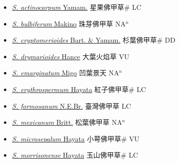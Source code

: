 \begin{itemize}
  \begin{itemize}
        \item[] \href{http://www.theplantlist.org/tpl1.1/search?q=Sedum+actinocarpum}{\textit{S. actinocarpum} Yamam.}   星果佛甲草\# LC
        \item[] \href{http://www.theplantlist.org/tpl1.1/search?q=Sedum+bulbiferum}{\textit{S. bulbiferum} Makino}   珠芽佛甲草 NA$^n$
        \item[] \href{http://www.theplantlist.org/tpl1.1/search?q=Sedum+cryptomerioides}{\textit{S. cryptomerioides} Bart. \& Yamam.}   杉葉佛甲草\# DD
        \item[] \href{http://www.theplantlist.org/tpl1.1/search?q=Sedum+drymarioides}{\textit{S. drymarioides} Hance}   大葉火焰草 VU
        \item[] \href{http://www.theplantlist.org/tpl1.1/search?q=Sedum+emarginatum}{\textit{S. emarginatum} Migo}   凹葉景天 NA$^n$
        \item[] \href{http://www.theplantlist.org/tpl1.1/search?q=Sedum+erythrospermum}{\textit{S. erythrospermum} Hayata}   紅子佛甲草\# LC
        \item[] \href{http://www.theplantlist.org/tpl1.1/search?q=Sedum+formosanum}{\textit{S. formosanum} N.E.Br.}   臺灣佛甲草 LC
        \item[] \href{http://www.theplantlist.org/tpl1.1/search?q=Sedum+mexicanum}{\textit{S. mexicanum} Britt.}   松葉佛甲草 NA$^n$
        \item[] \href{http://www.theplantlist.org/tpl1.1/search?q=Sedum+microsepalum}{\textit{S. microsepalum} Hayata}   小萼佛甲草\# VU
        \item[] \href{http://www.theplantlist.org/tpl1.1/search?q=Sedum+morrisonense}{\textit{S. morrisonense} Hayata}   玉山佛甲草\# LC

\end{itemize}
\end{itemize}
